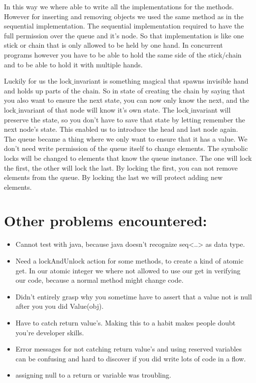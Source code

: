 In this way we where able to write all the implementations for the methods. However for inserting and removing objects we used the same method as in the sequential implementation. The sequential implementation required to have the full permission over the queue and it's node. So that implementation is like one stick or chain that is only allowed to be held by one hand. In concurrent programs however you have to be able to hold the same side of the stick/chain and to be able to hold it with multiple hands. 

Luckily for us the lock$\_$invariant is something magical that spawns invisible hand and holds up parts of the chain. So in state of creating the chain by saying that you also want to ensure the next state, you can now only know the next, and the lock$\_$invariant of that node will know it's own state. The lock$\_$invariant will preserve the state, so you don't have to save that state by letting remember the next node's state. This enabled us to introduce the head and last node again. The queue became a thing where we only want to ensure that it has a value. We don't need write permission of the queue itself to change elements. The symbolic locks will be changed to elements that know the queue instance. The one will lock the first, the other will lock the last. By locking the first, you can not remove elements from the queue. By locking the last we will protect adding new elements.

\section{Other problems encountered:}
\begin{itemize}
	\item Cannot test with java, because java doesn't recognize seq<..> as data type.
	\item Need a lockAndUnlock action for some methods, to create a kind of atomic get. In our atomic integer we where not allowed to use our get in verifying our code, because a normal method might change code.
	\item Didn't entirely grasp why you sometime have to assert that a value not is null after you you did Value(obj).
	\item Have to catch return value's. Making this to a habit makes people doubt you're developer skills.
	\item Error messages for not catching return value's and using reserved variables can be confusing and hard to discover if you did write lots of code in a flow.
	\item assigning null to a return or variable was troubling.
\end{itemize}


